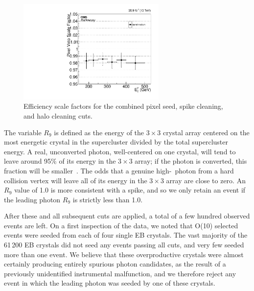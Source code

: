 \begin{figure}[hbtp]
  \begin{center}
    \includegraphics[width=0.65\textwidth]{Figures/pixseed_SF.pdf}
    \caption{
    Efficiency scale factors for the combined pixel seed, spike cleaning, and halo cleaning cuts.
    }
    \label{fig:pixseed_SF}
  \end{center}
\end{figure}

The variable $R_{9}$ is defined as the energy of the $3{\times}3$ crystal array centered on the most energetic crystal in the supercluster divided by the total supercluster energy.
A real, unconverted photon, well-centered on one crystal, will tend to leave around 95\% of its energy in the $3{\times}3$ array; if the photon is converted, this fraction will
be smaller~\cite{ref:1748-0221/10/08/P08010}. The odds that a genuine high-\pT\ photon from a hard collision vertex will leave all of its energy in the $3{\times}3$ array
are close to zero. An $R_{9}$ value of 1.0 is more consistent with a spike, and so we only retain an event if the leading photon $R_{9}$ is strictly less than 1.0.

After these and all subsequent cuts are applied, a total of a few hundred observed events are left. On a first inspection of the data, we noted that O(10) selected events
were seeded from each of four single EB crystals. The vast majority of the 61\,200 EB crystals did not seed any events passing all cuts, and very few seeded more than one event.
We believe that these overproductive crystals were almost certainly producing entirely spurious photon candidates, as the result of a previously unidentified
instrumental malfunction, and we therefore reject any event in which the leading photon was seeded by one of these crystals.

